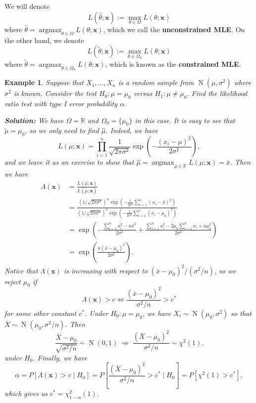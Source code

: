 \documentclass[10pt]{article}
\newcommand{\R}{\mathbb{R}}
\DeclareMathOperator{\Nor}{N}
\DeclareMathOperator{\argmax}{argmax}
\theoremstyle{newstyle}
\newtheorem{exmp}[thm]{Example}
\begin{document}
We will denote 
\[ L(\hat\theta; \mathbf x) := \max_{\theta \in \Omega} L(\theta; \mathbf x) \]
where $\hat\theta = \argmax_{\theta \in \Omega} L(\theta; \mathbf x)$, which we call the 
{\bf unconstrained MLE}. On the other hand, we denote 
\[ L(\tilde\theta; \mathbf x) := \max_{\theta \in \Omega_0} L(\theta; \mathbf x) \]
where $\tilde\theta = \argmax_{\theta \in \Omega_0} L(\theta; \mathbf x)$, which is known as the 
{\bf constrained MLE}. 

\begin{exmp}
Suppose that $X_1, \dots, X_n$ is a random sample from $\Nor(\mu, \sigma^2)$ where 
$\sigma^2$ is known. Consider the test $H_0 : \mu = \mu_0$ versus $H_1 : \mu \neq \mu_0$. 
Find the likelihood ratio test with type I error probability $\alpha$. 

{\color{blue}
{\bf Solution:} We have $\Omega = \R$ and $\Omega_0 = \{\mu_0\}$ in this case. It is easy to see that 
$\tilde\mu = \mu_0$, so we only need to find $\hat\mu$. Indeed, we have 
\[ L(\mu; \mathbf x) = \prod_{i=1}^n \frac{1}{\sqrt{2\pi\sigma^2}} \exp \left( - \frac{(x_i - \mu)^2}{2\sigma^2} \right), \]
and we leave it as an exercise to show that $\hat\mu = \argmax_{\mu \in \R} L(\mu; \mathbf x) = 
\bar x$. Then we have 
\begin{align*}
    \Lambda(\mathbf x) 
    &= \frac{L(\hat\mu; \mathbf x)}{L(\tilde\mu; \mathbf x)} \\
    &= \frac{(1/\sqrt{2\pi\sigma^2})^n \exp(-\frac{1}{2\sigma^2} \sum_{i=1}^n (x_i - \bar x)^2)}
    {(1/\sqrt{2\pi\sigma^2})^n \exp(-\frac{1}{2\sigma^2} \sum_{i=1}^n (x_i - \mu_0)^2)} \\
    &= \exp \left( - \frac{\sum_{i=1}^n x_i^2 - n\bar x^2}{2\sigma^2} + 
    \frac{\sum_{i=1}^n x_i^2 - 2\mu_0 \sum_{i=1}^n x_i + n\mu_0^2}{2\sigma^2} \right) \\
    &= \exp \left( \frac{n(\bar x - \mu_0)^2}{2\sigma^2} \right). 
\end{align*}
Notice that $\Lambda(\mathbf x)$ is increasing with respect to $(\bar x - \mu_0)^2 / (\sigma^2/n)$, 
so we reject $\mu_0$ if 
\[ \Lambda(\mathbf x) > c \iff \frac{(\bar x - \mu_0)^2}{\sigma^2/n} > c^* \]
for some other constant $c^*$. Under $H_0 : \mu = \mu_0$, we have $X_i \sim \Nor(\mu_0, \sigma^2)$ 
so that $\overline X \sim \Nor(\mu_0, \sigma^2/n)$. Then
\[ \frac{\overline X - \mu_0}{\sqrt{\sigma^2/n}} \sim \Nor(0, 1) \;\Longrightarrow\; 
\frac{(\overline X - \mu_0)^2}{\sigma^2/n} \sim \chi^2(1). \]
under $H_0$. Finally, we have 
\[ \alpha = P[\Lambda(\mathbf x) > c \mid H_0] = P \left[ \frac{(\overline X - \mu_0)^2}{\sigma^2/n} > c^* \;\Bigg|\; H_0 \right] = P[\chi^2(1) > c^*], \]
which gives us $c^* = \chi^2_{1-\alpha}(1)$.}
\end{exmp}
\end{document}
